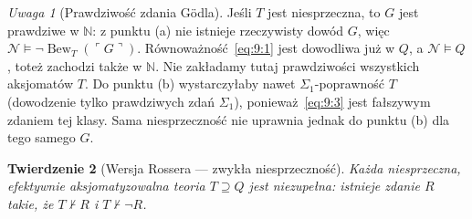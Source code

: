 \documentclass[11pt,a4paper]{article}
\numberwithin{equation}{section}
\theoremstyle{plain}
\newtheorem{twierdzenie}{Twierdzenie}[section]
\theoremstyle{definition}
\theoremstyle{remark}
\newtheorem{uwaga}[twierdzenie]{Uwaga}
\begin{document}
\begin{uwaga}[Prawdziwość zdania Gödla]\label{res:9:3}
Jeśli $T$ jest niesprzeczna, to $G$ jest prawdziwe w $\mathbb N$: z punktu (a) nie istnieje rzeczywisty dowód $G$, więc $\mathcal N\models\neg\operatorname{Bew}_T(\ulcorner G\urcorner)$. Równoważność~\eqref{eq:9:1} jest dowodliwa już w $Q$, a $\mathcal N\models Q$, toteż zachodzi także w $\mathbb N$. Nie zakładamy tutaj prawdziwości wszystkich aksjomatów $T$. Do punktu (b) wystarczyłaby nawet $\Sigma_1$-poprawność $T$ (dowodzenie tylko prawdziwych zdań $\Sigma_1$), ponieważ~\eqref{eq:9:3} jest fałszywym zdaniem tej klasy. Sama niesprzeczność nie uprawnia jednak do punktu (b) dla tego samego $G$.
\end{uwaga}

\begin{twierdzenie}[Wersja Rossera --- zwykła niesprzeczność]\label{res:9:4}
Każda niesprzeczna, efektywnie aksjomatyzowalna teoria $T\supseteq Q$ jest niezupełna: istnieje zdanie $R$ takie, że $T\nvdash R$ i $T\nvdash\neg R$.
\end{twierdzenie}
\end{document}
